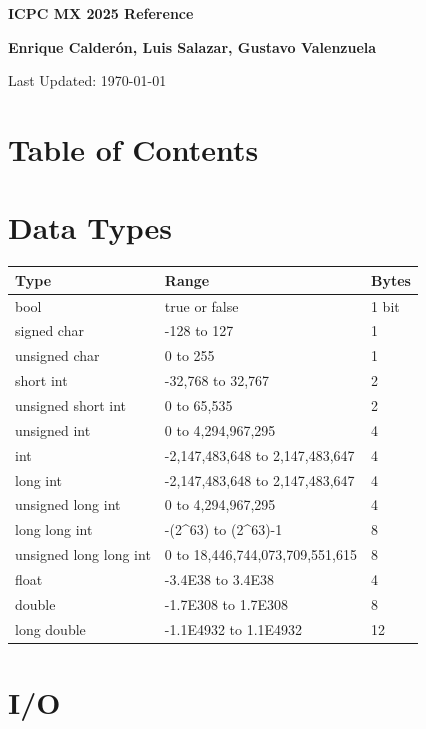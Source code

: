 \documentclass[10pt]{article}
\newcommand{\authorname}{\textbf{Enrique Calderón, Luis Salazar, Gustavo Valenzuela}}
\newcommand{\maketitlepage}{
    \begin{titlepage}
        \centering
        \vspace*{2cm}
        {\Huge\bfseries ICPC MX 2025 Reference\par}
        \vspace{1cm}
        {\Large \authorname \par}
        \vspace{2cm}
        {\large Last Updated: \today\par}
        \vfill
    \end{titlepage}
}
\begin{document}
\maketitlepage
\cleardoublepage

\section*{Table of Contents}
\begin{multicols*}{2}
    \startcontents[sections]
\end{multicols*}
\newpage

\begin{multicols*}{2}

\section{Data Types}
\begin{tabularx}{\linewidth}{|l|X|l|}
    \hline
    \textbf{Type} & \textbf{Range} & \textbf{Bytes} \\
    \hline
    bool & true or false & 1 bit \\
    \hline
    signed char & -128 to 127 & 1 \\
    \hline
    unsigned char & 0 to 255 & 1 \\
    \hline
    short int & -32,768 to 32,767 & 2 \\
    \hline
    unsigned short int & 0 to 65,535 & 2 \\
    \hline
    unsigned int & 0 to 4,294,967,295 & 4 \\
    \hline
    int & -2,147,483,648 to 2,147,483,647 & 4 \\
    \hline
    long int & -2,147,483,648 to 2,147,483,647 & 4 \\
    \hline
    unsigned long int & 0 to 4,294,967,295 & 4 \\
    \hline
    long long int & -(2\textasciicircum 63) to (2\textasciicircum 63)-1 & 8 \\
    \hline
    unsigned long long int & 0 to 18,446,744,073,709,551,615 & 8 \\
    \hline
    float & -3.4E38 to 3.4E38 & 4 \\
    \hline
    double & -1.7E308 to 1.7E308 & 8 \\
    \hline
    long double & -1.1E4932 to 1.1E4932 & 12 \\
    \hline
\end{tabularx}

\section{I/O}


\end{multicols*}
\end{document}
